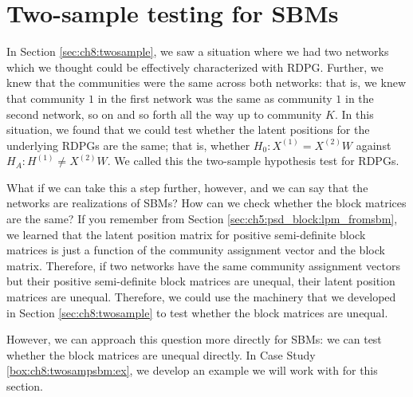 \section{Two-sample testing for SBMs}
\label{sec:ch8:twosamplesbm}

In Section \ref{sec:ch8:twosample}, we saw a situation where we had two networks which we thought could be effectively characterized with RDPG. Further, we knew that the communities were the same across both networks: that is, we knew that community $1$ in the first network was the same as community $1$ in the second network, so on and so forth all the way up to community $K$. In this situation, we found that we could test whether the latent positions for the underlying RDPGs are the same; that is, whether $H_0: X^{(1)} = X^{(2)}W$ against $H_A: H^{(1)} \neq X^{(2)}W$. We called this the two-sample hypothesis test for RDPGs. 

What if we can take this a step further, however, and we can say that the networks are realizations of SBMs? How can we check whether the block matrices are the same? If you remember from Section \ref{sec:ch5:psd_block:lpm_fromsbm}, we learned that the latent position matrix for positive semi-definite block matrices is just a function of the community assignment vector and the block matrix. Therefore, if two networks have the same community assignment vectors but their positive semi-definite block matrices are unequal, their latent position matrices are unequal. Therefore, we could use the machinery that we developed in Section \ref{sec:ch8:twosample} to test whether the block matrices are unequal.

However, we can approach this question more directly for SBMs: we can test whether the block matrices are unequal directly. In Case Study \ref{box:ch8:twosampsbm:ex}, we develop an example we will work with for this section.

